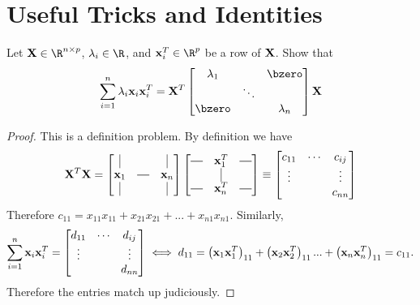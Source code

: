 \section{Useful Tricks and Identities}

\begin{problembox}{\hfill {\small \cite[Chapter 3.4]{dobson2008introduction}}}{}
Let $\bX \in \R^{n \times p}$, $\lambda_i \in \R$, and $\bx_i^T \in \R^p$ be a row of $\mathbf{X}$. Show that
\begin{align*}
	\sum_{i=1}^n \lambda_i \bx_i\bx_i^T = \bX^T
	\begin{bmatrix}
		\lambda_1 & & \bzero \\
		& \ddots & \\
		\bzero & & \lambda_n
	\end{bmatrix} \bX
\end{align*}
\end{problembox}

\begin{proof}
This is a definition problem. By definition we have 
\begin{align*}
	\bX^T\bX = 
	\begin{bmatrix}
		\vrule & & \vrule\\
		\bx_1 & \horzbar & \bx_n\\
		\vrule & & \vrule
	\end{bmatrix}
	\begin{bmatrix}
		\horzbar & \bx_1^T & \horzbar\\
		& \vrule & \\
		\horzbar & \bx_n^T & \horzbar
	\end{bmatrix}
	\equiv
	\begin{bmatrix}
	c_{11} & \cdots & c_{ij}\\
	\vdots & & \vdots \\
	& & c_{nn}
	\end{bmatrix}		
\end{align*}
Therefore $c_{11} = x_{11}x_{11} + x_{21}x_{21} + ... + x_{n1}x_{n1}.$ Similarly,
\begin{align*}
	\sum_{i=1}^n \mathbf{x}_i\mathbf{x}_i^T
	= 
	\begin{bmatrix}
		d_{11} & \cdots & d_{ij}\\
	    \vdots & & \vdots \\
	    & & d_{nn}
	\end{bmatrix}
	\iff d_{11} = \left(\mathbf{x}_1\mathbf{x}_1^T\right)_{11} + \left(\mathbf{x}_2\mathbf{x}_2^T\right)_{11}... + \left(\mathbf{x}_n\mathbf{x}_n^T\right)_{11} = c_{11}.
\end{align*}
Therefore the entries match up judiciously. 
\end{proof}

